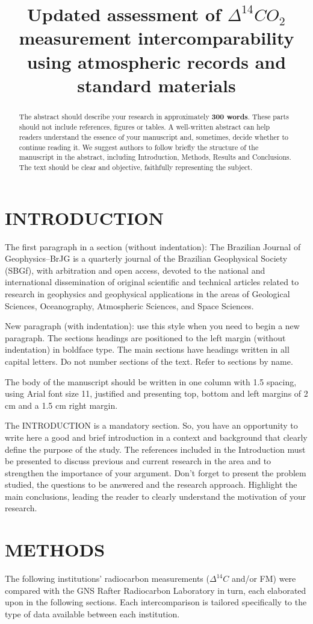 \documentclass{BrJG_submit}
\title{Updated assessment of ${\Delta^{14}CO_{2}}$ measurement intercomparability using atmospheric records and standard materials}
\begin{document}
\begin{abstract}
The abstract should describe your research in approximately {\bf 300 words}. These parts should not include references, figures or tables. A well-written abstract can help readers understand the essence of your manuscript and, sometimes, decide whether to continue reading it. We suggest authors to follow briefly the structure of the manuscript in the abstract, including Introduction, Methods, Results and Conclusions. The text should be clear and objective, faithfully representing the subject.
\end{abstract}


\section*{INTRODUCTION}

The first paragraph in a section (without indentation): The Brazilian Journal of Geophysics–BrJG is a quarterly journal of the Brazilian Geophysical Society (SBGf), with arbitration and open access, devoted to the national and international dissemination of original scientific and technical articles related to research in geophysics and geophysical applications in the areas of Geological Sciences, Oceanography, Atmospheric Sciences, and Space Sciences.

New paragraph (with indentation): use this style when you need to begin a new paragraph.
The sections headings are positioned to the left margin (without indentation) in boldface type. The main sections have headings written in all capital letters. Do not number sections of the text. Refer to sections by name.

The body of the manuscript should be written in one column with 1.5 spacing, using Arial font size 11, justified and presenting top, bottom and left margins of 2 cm and a 1.5 cm right margin.

The INTRODUCTION is a mandatory section. So, you have an opportunity to write here a good and brief introduction in a context and background that clearly define the purpose of the study. The references included in the Introduction must be presented to discuss previous and current research in the area and to strengthen the importance of your argument. Don’t forget to present the problem studied, the questions to be answered and the research approach. Highlight the main conclusions, leading the reader to clearly understand the motivation of your research.
\newpage
\section*{METHODS}
The following institutions' radiocarbon measurements (${\Delta^{14}C}$ and/or FM) 
 were compared with the GNS Rafter Radiocarbon Laboratory in turn, each elaborated upon in the following sections. Each intercomparison is tailored specifically to the type of data available between each institution. 
\end{document}
